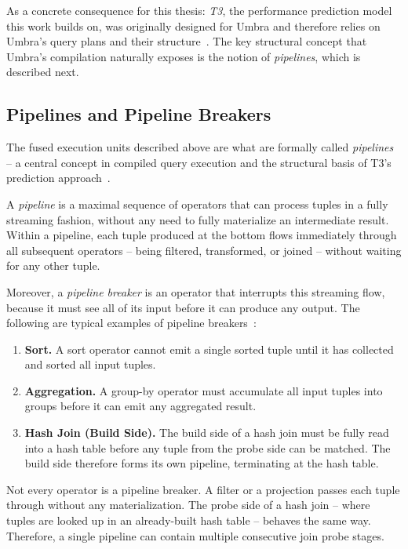As a concrete consequence for this thesis: \emph{T3}, the performance prediction model this work builds on, was originally designed for Umbra and therefore relies on Umbra's query plans and their structure~\parencite{t3}.
The key structural concept that Umbra's compilation naturally exposes is the notion of \emph{pipelines}, which is described next.

\subsection{Pipelines and Pipeline Breakers}

The fused execution units described above are what are formally called \emph{pipelines} -- a central concept in compiled query execution and the structural basis of T3's prediction approach~\parencite{t3}.

A \emph{pipeline} is a maximal sequence of operators that can process tuples in a fully streaming fashion, without any need to fully materialize an intermediate result.
Within a pipeline, each tuple produced at the bottom flows immediately through all subsequent operators -- being filtered, transformed, or joined -- without waiting for any other tuple.

Moreover, a \emph{pipeline breaker} is an operator that interrupts this streaming flow, because it must see all of its input before it can produce any output.
The following are typical examples of pipeline breakers~\parencite{t3}:

\begin{enumerate}
  \item \textbf{Sort.} A sort operator cannot emit a single sorted tuple until it has collected and sorted all input tuples.
  \item \textbf{Aggregation.} A group-by operator must accumulate all input tuples into groups before it can emit any aggregated result.
  \item \textbf{Hash Join (Build Side).} The build side of a hash join must be fully read into a hash table before any tuple from the probe side can be matched.
    The build side therefore forms its own pipeline, terminating at the hash table.
\end{enumerate}

Not every operator is a pipeline breaker.
A filter or a projection passes each tuple through without any materialization.
The probe side of a hash join -- where tuples are looked up in an already-built hash table -- behaves the same way.
Therefore, a single pipeline can contain multiple consecutive join probe stages.

